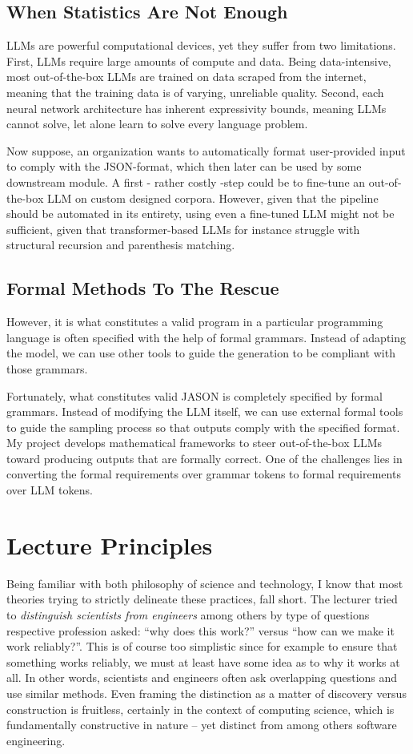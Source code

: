 \documentclass[a4paper, 11pt]{article}
\begin{document}
\subsection{When Statistics Are Not Enough}
LLMs are powerful computational devices, yet they suffer from two limitations.  First, LLMs require large amounts of compute and data. Being data-intensive, most out-of-the-box LLMs are trained on data scraped from the internet, meaning that the training data is of varying, unreliable quality. Second, each neural network architecture has inherent expressivity bounds, meaning LLMs cannot solve, let alone learn to solve every language problem.

Now suppose, an organization wants to automatically format user-provided input to comply with the JSON-format, which then later can be used by some downstream module. A first - rather costly -step could be to fine-tune an out-of-the-box LLM on custom designed corpora. However, given that the pipeline should be automated in its entirety, using even a fine-tuned LLM might not be sufficient, given that transformer-based LLMs for instance struggle with structural recursion and parenthesis matching. 
 
\subsection{Formal Methods To The Rescue}
However, it is what constitutes a valid program in a  particular programming language is often specified with the help of formal grammars. Instead of adapting the model, we can use other tools to guide the generation to be compliant with those grammars. 

Fortunately, what constitutes valid JASON is completely specified by formal grammars. Instead of modifying the LLM itself, we can use external formal tools to guide the sampling process so that outputs comply with the specified format. My project develops mathematical frameworks to steer out-of-the-box LLMs toward producing outputs that are formally correct. One of the challenges lies in converting the formal requirements over grammar tokens to formal requirements over LLM tokens.


\section{Lecture Principles}
Being familiar with both philosophy of science and technology, I know that most theories trying to strictly delineate these practices, fall short. The lecturer tried to \emph{distinguish scientists from engineers}  among others by type of questions respective profession asked: “why does this work?” versus “how can we make it work reliably?”. This is of course too simplistic since for example to ensure that something works reliably, we must at least have some idea as to why it works at all. In other words, scientists and engineers often ask overlapping questions and use similar methods. Even framing the distinction as a matter of discovery versus construction is fruitless, certainly in the context of computing science, which is fundamentally constructive in nature – yet distinct from among others software engineering. 
\end{document}
